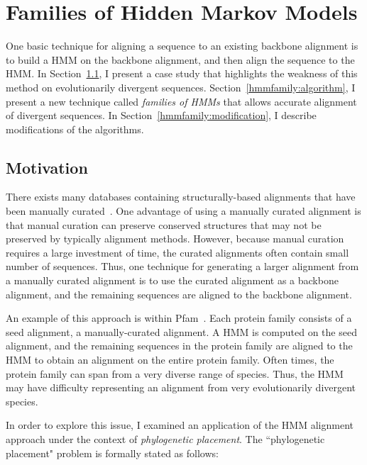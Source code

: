 \chapter{Families of Hidden Markov Models}
\label{hmmfamily}

One basic technique for aligning a sequence to an existing backbone alignment is to build a HMM on the backbone alignment, and then align the sequence to the HMM.  In Section~\ref{hmmfamily:motivation}, I present a case study that highlights the weakness of this method on evolutionarily divergent sequences.  Section~\ref{hmmfamily:algorithm}, I present a new technique called \emph{families of HMMs} that allows accurate alignment of divergent sequences.  In Section~\ref{hmmfamily:modification}, I describe modifications of the algorithms.  

\section{Motivation}\label{hmmfamily:motivation}
There exists many databases containing structurally-based alignments that have been manually curated~\cite{Cannone2002,Thompson1999,Punta2012}.  One advantage of using a manually curated alignment is that manual curation can preserve conserved structures that may not be preserved by typically alignment methods.  However, because manual curation requires a large investment of time, the curated alignments often contain small number of sequences.  Thus, one technique for generating a larger alignment from a manually curated alignment is to use the curated alignment as a backbone alignment, and the remaining sequences are aligned to the backbone alignment.  

An example of this approach is within Pfam~\cite{Punta2012}.  Each protein family consists of a seed alignment, a manually-curated alignment.  A HMM is computed on the seed alignment, and the remaining sequences in the protein family are aligned to the HMM to obtain an alignment on the entire protein family.  Often times, the protein family can span from a very diverse range of species.  Thus, the HMM may have difficulty representing an alignment from very evolutionarily divergent species.

In order to explore this issue, I examined an application of the HMM alignment approach under the context of \emph{phylogenetic placement}.  The ``phylogenetic placement" problem is formally stated as follows:

